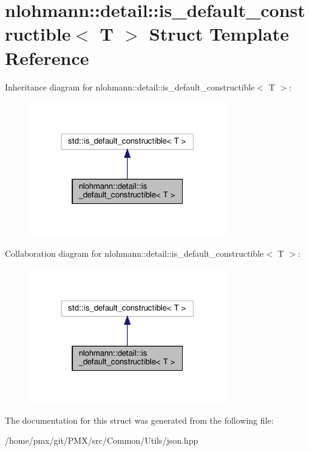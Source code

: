 \hypertarget{structnlohmann_1_1detail_1_1is__default__constructible}{}\section{nlohmann\+:\+:detail\+:\+:is\+\_\+default\+\_\+constructible$<$ T $>$ Struct Template Reference}
\label{structnlohmann_1_1detail_1_1is__default__constructible}


Inheritance diagram for nlohmann\+:\+:detail\+:\+:is\+\_\+default\+\_\+constructible$<$ T $>$\+:
\nopagebreak
\begin{figure}[H]
\begin{center}
\leavevmode
\includegraphics[width=243pt]{structnlohmann_1_1detail_1_1is__default__constructible__inherit__graph}
\end{center}
\end{figure}


Collaboration diagram for nlohmann\+:\+:detail\+:\+:is\+\_\+default\+\_\+constructible$<$ T $>$\+:
\nopagebreak
\begin{figure}[H]
\begin{center}
\leavevmode
\includegraphics[width=243pt]{structnlohmann_1_1detail_1_1is__default__constructible__coll__graph}
\end{center}
\end{figure}


The documentation for this struct was generated from the following file\+:\begin{DoxyCompactItemize}
\item 
/home/pmx/git/\+P\+M\+X/src/\+Common/\+Utils/json.\+hpp\end{DoxyCompactItemize}
